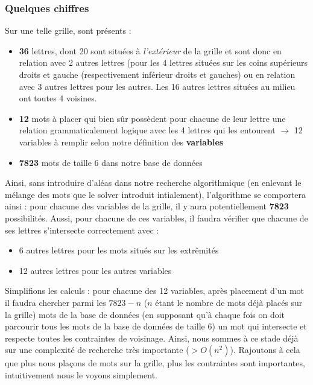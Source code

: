 \documentclass [ 11 pt ] {article}
\begin{document}
        \subsubsection{Quelques chiffres}
        Sur une telle grille, sont présents : 
        \begin{itemize}
            \item \textbf{36} lettres, dont 20 sont situées à \textit{l'extérieur} de la grille et sont donc en relation avec 2 autres lettres (pour les 4 lettres situées sur les coins supérieurs droits et gauche (respectivement inférieur droits et gauches) ou en relation avec 3 autres lettres pour les autres. Les 16 autres lettres situées au milieu ont toutes 4 voisines. 
            
            \item \textbf{12} mots à placer qui bien sûr possèdent pour chacune de leur lettre une relation grammaticalement logique avec les 4 lettres qui les entourent $\rightarrow$ 12 variables à remplir selon notre définition des \textbf{variables}
            
            \item \textbf{7823} mots de taille 6 dans notre base de données
            
        \end{itemize}
        
        Ainsi, sans introduire d'aléas dans notre recherche algorithmique (en enlevant le mélange des mots que le solver introduit intialement), l'algorithme se comportera ainsi : pour chacune des variables de la grille, il y aura potentiellement \textbf{7823} possibilités. Aussi, pour chacune de ces variables, il faudra vérifier que chacune de ses lettres s'intersecte correctement avec : 
        
        \begin{itemize}
            \item 6 autres lettres pour les mots situés sur les extrêmités
            
            \item 12 autres lettres pour les autres variables
        \end{itemize}
        
        Simplifions les calculs : pour chacune des 12 variables, après placement d'un mot il faudra chercher parmi les \textbf{$7823 - n$} ($n$ étant le nombre de mots déjà placés sur la grille) mots de la base de données (en supposant qu'à chaque fois on doit parcourir tous les mots de la base de données de taille 6) un mot qui intersecte et respecte toutes les contraintes de voisinage. Ainsi, nous sommes à ce stade déjà sur une complexité de recherche très importante ($ > O(n^2) $). Rajoutons à cela que plus nous plaçons de mots sur la grille, plus les contraintes sont importantes, intuitivement nous le voyons simplement. \\
        
\end{document}
